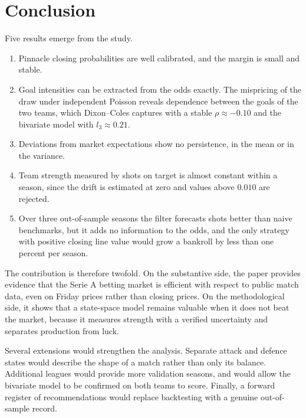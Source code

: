 \documentclass[11pt,a4paper]{article}
\begin{document}
\section{Conclusion}
Five results emerge from the study.

\begin{enumerate}
\item Pinnacle closing probabilities are well calibrated, and the margin is small and stable.
\item Goal intensities can be extracted from the odds exactly. The mispricing of the draw under
independent Poisson reveals dependence between the goals of the two teams, which Dixon--Coles captures
with a stable $\rho \approx -0.10$ and the bivariate model with $l_3 \approx 0.21$.
\item Deviations from market expectations show no persistence, in the mean or in the variance.
\item Team strength measured by shots on target is almost constant within a season, since the drift is
estimated at zero and values above $0.010$ are rejected.
\item Over three out-of-sample seasons the filter forecasts shots better than naive benchmarks, but it
adds no information to the odds, and the only strategy with positive closing line value would grow a
bankroll by less than one percent per season.
\end{enumerate}

The contribution is therefore twofold. On the substantive side, the paper provides evidence that the
Serie A betting market is efficient with respect to public match data, even on Friday prices rather
than closing prices. On the methodological side, it shows that a state-space model remains valuable
when it does not beat the market, because it measures strength with a verified uncertainty and
separates production from luck.

Several extensions would strengthen the analysis. Separate attack and defence states would describe
the shape of a match rather than only its balance. Additional leagues would provide more validation
seasons, and would allow the bivariate model to be confirmed on both teams to score. Finally, a forward
register of recommendations would replace backtesting with a genuine out-of-sample record.
\end{document}

